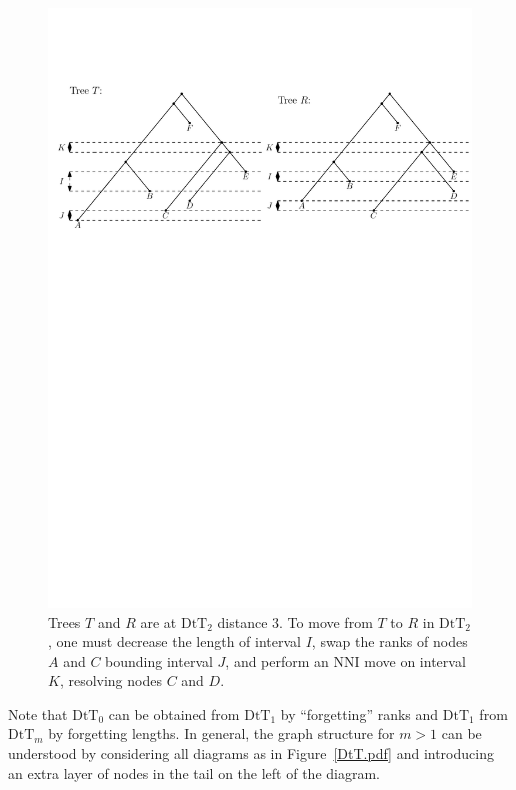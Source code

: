 \documentclass[11pt]{amsart}
\theoremstyle{definition}
\newcommand{\nni}{\mathrm{NNI}}
\newcommand{\dtt}{\mathrm{DtT}}
\begin{document}
\begin{figure}[ht]
\centering
\includegraphics[width=\textwidth]{dts_neighbors.pdf}
\caption{Trees $T$ and $R$ are at $\dtt_2$ distance $3$.
To move from $T$ to $R$ in $\dtt_2$, one must decrease the length of interval $I$, swap the ranks of nodes $A$ and $C$ bounding interval $J$, and perform an $\nni$ move on interval $K$, resolving nodes $C$ and $D$.}
\label{dts_neighbors.pdf}
\end{figure}

Note that $\dtt_0$ can be obtained from $\dtt_1$ by ``forgetting'' ranks and $\dtt_1$ from $\dtt_m$ by forgetting lengths.
In general, the graph structure for $m > 1$ can be understood by considering all diagrams as in Figure~\ref{DtT.pdf} and introducing an extra layer of nodes in the tail on the left of the diagram.
\end{document}
